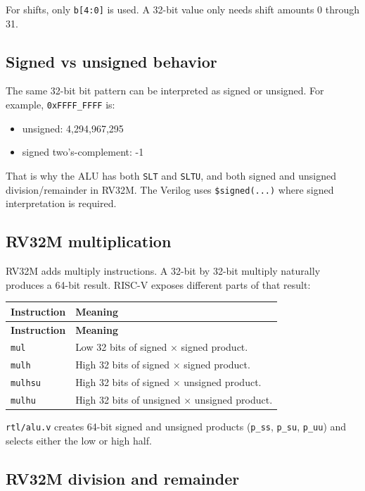 For shifts, only \texttt{b[4:0]} is used. A 32-bit value only needs shift amounts 0 through 31.

\subsection{Signed vs unsigned behavior}

The same 32-bit bit pattern can be interpreted as signed or unsigned. For example, \texttt{0xFFFF\_FFFF} is:

\begin{itemize}
\item unsigned: 4,294,967,295
\item signed two’s-complement: -1
\end{itemize}
That is why the ALU has both \texttt{SLT} and \texttt{SLTU}, and both signed and unsigned division/remainder in RV32M. The Verilog uses \texttt{\$signed(...)} where signed interpretation is required.

\subsection{RV32M multiplication}

RV32M adds multiply instructions. A 32-bit by 32-bit multiply naturally produces a 64-bit result. RISC-V exposes different parts of that result:

\begin{longtable}{|>{\RaggedRight\arraybackslash}p{}|>{\RaggedRight\arraybackslash}p{}|}
\hline
\textbf{Instruction} & \textbf{Meaning} \\
\hline
\endfirsthead
\hline
\textbf{Instruction} & \textbf{Meaning} \\
\hline
\endhead
\texttt{mul} & Low 32 bits of signed × signed product. \\
\hline
\texttt{mulh} & High 32 bits of signed × signed product. \\
\hline
\texttt{mulhsu} & High 32 bits of signed × unsigned product. \\
\hline
\texttt{mulhu} & High 32 bits of unsigned × unsigned product. \\
\hline
\end{longtable}

\texttt{rtl/alu.v} creates 64-bit signed and unsigned products (\texttt{p\_ss}, \texttt{p\_su}, \texttt{p\_uu}) and selects either the low or high half.

\subsection{RV32M division and remainder}

